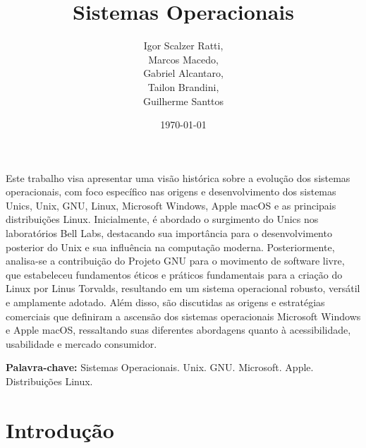 \documentclass[12pt,oneside,a4paper]{abntex2}
\title{\huge Sistemas Operacionais}
\author{
    Igor Scalzer Ratti,\\
    Marcos Macedo,\\
    Gabriel Alcantaro,\\
    Tailon Brandini,\\
    Guilherme Santtos
}
\date{\today}
\begin{document}
\maketitle
\pagestyle{plain}       %
\thispagestyle{empty}
\setcounter{page}{0}
\setlength{\jot}{15pt}

\newpage

\tableofcontents
{}
\thispagestyle{plain}
\setcounter{page}{1}

\newpage


\begin{resumo}

    Este trabalho visa apresentar uma visão histórica sobre a evolução dos sistemas operacionais, com foco específico nas origens e desenvolvimento dos sistemas Unics, Unix, GNU, Linux, Microsoft Windows, Apple macOS e as principais distribuições Linux. Inicialmente, é abordado o surgimento do Unics nos laboratórios Bell Labs, destacando sua importância para o desenvolvimento posterior do Unix e sua influência na computação moderna. Posteriormente, analisa-se a contribuição do Projeto GNU para o movimento de software livre, que estabeleceu fundamentos éticos e práticos fundamentais para a criação do Linux por Linus Torvalds, resultando em um sistema operacional robusto, versátil e amplamente adotado. Além disso, são discutidas as origens e estratégias comerciais que definiram a ascensão dos sistemas operacionais Microsoft Windows e Apple macOS, ressaltando suas diferentes abordagens quanto à acessibilidade, usabilidade e mercado consumidor.

    \vspace{0.5cm}

    \noindent \textbf{Palavra-chave:} Sistemas Operacionais. Unix. GNU. Microsoft. Apple. Distribuições Linux.
    
\end{resumo}

\section{Introdução}
\end{document}

